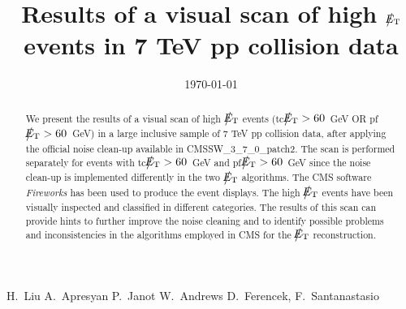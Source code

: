\documentclass{cmspaper}
\def\etmiss{\big\slash\hspace{-1.6ex}{E_\text{T}}}
\begin{document}
\begin{linenumbers}


\begin{titlepage}


  \date{\today}

  \title{Results of a visual scan of high $\etmiss$ events in 7 TeV pp collision data}

  \begin{Authlist}
    H.~Liu
    A.~Apresyan
    P.~Janot
    W.~Andrews
    D.~Ferencek, F.~Santanastasio %
  \end{Authlist}



  \begin{abstract}    
   We present the results of a visual scan of high $\etmiss$ events 
   (tc$\etmiss>60$~GeV OR pf$\etmiss>60$~GeV)
   in a large inclusive sample of 7 TeV pp collision data, 
   after applying the official noise clean-up available in CMSSW\_3\_7\_0\_patch2. 
   The scan is performed separately for events with tc$\etmiss>60$~GeV and pf$\etmiss>60$~GeV
   since the noise clean-up is implemented differently in the two $\etmiss$ algorithms.
   The CMS software {\it Fireworks} has been used to produce the event displays. 
   The high $\etmiss$ events have been visually inspected and classified in different 
   categories. The results of this scan can provide hints to further improve the noise 
   cleaning and to identify possible problems and inconsistencies in the algorithms employed 
   in CMS for the $\etmiss$ reconstruction.
  \end{abstract} 

  
\end{titlepage}

\setcounter{page}{2}%

\tableofcontents

\clearpage





\clearpage

\clearpage



\end{linenumbers}
\end{document}
